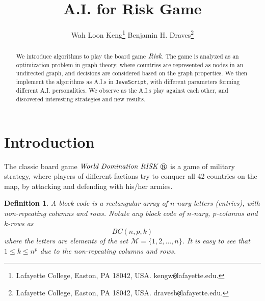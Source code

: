 \documentclass[12pt]{article}  %
\newtheorem{definition}{Definition}
\begin{document}
\title{A.I. for Risk Game}

\author{
{Wah Loon Keng}\thanks{
Lafayette College,
Easton, PA 18042, USA.
kengw{\tt @}lafayette.edu.}
\qquad
{Benjamin H. Draves}\thanks{
Lafayette College,
Easton, PA 18042, USA.
dravesb{\tt @}lafayette.edu.}
}
\maketitle

\begin{abstract}
We introduce algorithms to play the board game $\emph{Risk}$. The game is analyzed as an optimization problem in graph theory, where countries are represented as nodes in an undirected graph, and decisions are considered based on the graph properties. We then implement the algorithms as A.I.s in {\tt JavaScript}, with different parameters forming different A.I. personalities. We observe as the A.I.s play against each other, and discovered interesting strategies and new results.
\end{abstract}










\section{Introduction} \label{intro}

The classic board game $\emph{World Domination RISK \circledR}$ is a game of military strategy, where players of different factions try to conquer all 42 countries on the map, by attacking and defending with his/her armies.

\begin{definition}
A block code is a rectangular array of $n$-nary letters (entries), with non-repeating columns and rows. Notate any block code of $n$-nary, $p$-columns and $k$-rows as 
$$BC(n,p,k)$$
where the letters are elements of the set $\mathcal{M}=\{1,2,\dots,n\}$. 
It is easy to see that $1\leq k \leq n^p$ due to the non-repeating columns and rows.
\end{definition}
\end{document}
